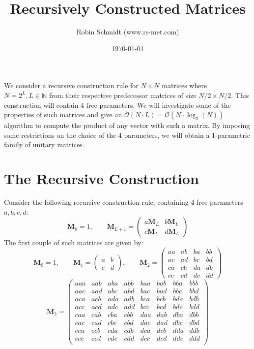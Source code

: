 \title{Recursively Constructed Matrices}
\author{Robin Schmidt (www.rs-met.com)}
\date{\today}
\maketitle

We consider a recursive construction rule for $N \times N$ matrices where $N = 2^L, L \in \mathbb{N}$ from their respective predecessor matrices of size $N/2 \times N/2$. This construction will contain 4 free parameters. We will investigate some of the properties of such matrices and give an $\mathcal{O}(N \cdot L) = \mathcal{O}(N \cdot \log_2(N))$ algorithm to compute the product of any vector with such a matrix. By imposing some restrictions on the choice of the 4 parameters, we will obtain a 1-parametric family of unitary matrices.

\section{The Recursive Construction}
Consider the following recursive construction rule, containing 4 free parameters $a, b, c, d$:
\begin{equation}
 \mathbf{M}_0 = 1, \qquad
 \mathbf{M}_{L+1} =
 \begin{pmatrix}
 a \mathbf{M}_L &  b \mathbf{M}_L  \\
 c \mathbf{M}_L &  d \mathbf{M}_L
 \end{pmatrix}
\end{equation}
The first couple of such matrices are given by:
\begin{equation}
 \mathbf{M}_0 = 1, \qquad
 \mathbf{M}_1 =
 \begin{pmatrix}
 a & b \\
 c & d 
 \end{pmatrix}, \qquad
 \mathbf{M}_2 =
 \begin{pmatrix}
 aa & ab & ba & bb \\
 ac & ad & bc & bd \\
 ca & cb & da & db \\
 cc & cd & dc & dd
 \end{pmatrix} 
\end{equation}
\begin{equation}
 \mathbf{M}_3 =
 \begin{pmatrix}
 aaa & aab & aba & abb    & baa & bab & bba & bbb  \\
 aac & aad & abc & abd    & bac & bad & bbc & bbd  \\
 aca & acb & ada & adb    & bca & bcb & bda & bdb  \\
 acc & acd & adc & add    & bcc & bcd & bdc & bdd  \\
 caa & cab & cba & cbb    & daa & dab & dba & dbb  \\
 cac & cad & cbc & cbd    & dac & dad & dbc & dbd  \\
 cca & ccb & cda & cdb    & dca & dcb & dda & ddb  \\
 ccc & ccd & cdc & cdd    & dcc & dcd & ddc & ddd  \\ 
 \end{pmatrix} 
\end{equation}

